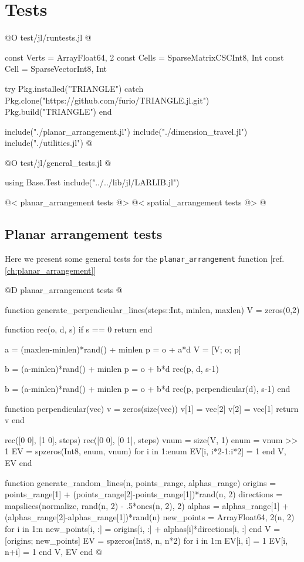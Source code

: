 \chapter{Tests}

@O test/jl/runtests.jl
@{const Verts = Array{Float64, 2}
const Cells = SparseMatrixCSC{Int8, Int}
const Cell = SparseVector{Int8, Int}

try
	Pkg.installed("TRIANGLE")
catch
	Pkg.clone("https://github.com/furio/TRIANGLE.jl.git")
	Pkg.build("TRIANGLE")
end

include("./planar_arrangement.jl")
include("./dimension_travel.jl")
include("./utilities.jl")
@}

@O test/jl/general_tests.jl
@{using Base.Test
include("../../lib/jl/LARLIB.jl")

@< planar\_arrangement tests @>
@< spatial\_arrangement tests @>
@}

\section{Planar arrangement tests}
\label{ch:planar_arrangement_tests}

Here we present some general tests for the \texttt{planar\_arrangement} function [ref. \ref{ch:planar_arrangement}]

@D planar\_arrangement tests
@{function generate_perpendicular_lines(steps::Int, minlen, maxlen)
    V = zeros(0,2)

    function rec(o, d, s)
        if s == 0 return end

        a = (maxlen-minlen)*rand() + minlen
        p = o + a*d
        V = [V; o; p]

        b = (a-minlen)*rand() + minlen
        p = o + b*d
        rec(p, d, s-1)

        b = (a-minlen)*rand() + minlen
        p = o + b*d
        rec(p, perpendicular(d), s-1)
    end

    function perpendicular(vec)
        v = zeros(size(vec))
        v[1] = vec[2]
        v[2] = vec[1]
        return v
    end

    rec([0 0], [1 0], steps)
    rec([0 0], [0 1], steps)
    vnum = size(V, 1)
    enum = vnum >> 1
    EV = spzeros(Int8, enum, vnum)
    for i in 1:enum
        EV[i, i*2-1:i*2] = 1
    end
    V, EV
end


function generate_random_lines(n, points_range, alphas_range)
    origins = points_range[1] + (points_range[2]-points_range[1])*rand(n, 2)
    directions = mapslices(normalize, rand(n, 2) - .5*ones(n, 2), 2)
    alphas = alphas_range[1] + (alphas_range[2]-alphas_range[1])*rand(n)
    new_points = Array{Float64, 2}(n, 2)
    for i in 1:n
        new_points[i, :] = origins[i, :] + alphas[i]*directions[i, :]
    end
    V = [origins; new_points]
    EV = spzeros(Int8, n, n*2)
    for i in 1:n
        EV[i, i] = 1
        EV[i, n+i] = 1
    end
    V, EV
end
@}

